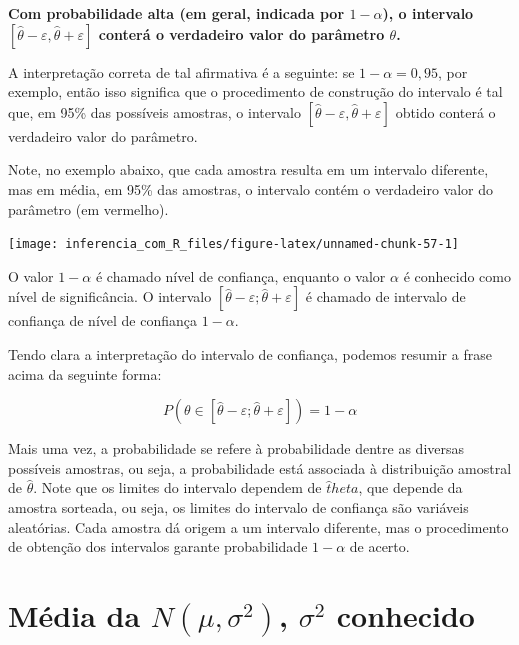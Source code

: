 \documentclass[
]{book}
\begin{document}
\textbf{Com probabilidade alta (em geral, indicada por $1-\alpha$), o intervalo $\left[\hat\theta-\varepsilon,\hat\theta+\varepsilon\right]$ conterá o verdadeiro valor do parâmetro $\theta$.}

A interpretação correta de tal afirmativa é a seguinte: se \(1-\alpha=0,95\), por exemplo, então isso significa que o procedimento de construção do intervalo é tal que, em 95\% das possíveis amostras, o intervalo \(\left[\hat\theta-\varepsilon,\hat\theta+\varepsilon\right]\) obtido conterá o verdadeiro valor do parâmetro.

Note, no exemplo abaixo, que cada amostra resulta em um intervalo diferente, mas em média, em 95\% das amostras, o intervalo contém o verdadeiro valor do parâmetro (em vermelho).

\begin{center}\texttt{[image: inferencia\_com\_R\_files/figure-latex/unnamed-chunk-57-1]} \end{center}

O valor \(1 - \alpha\) é chamado nível de confiança, enquanto o valor \(\alpha\) é conhecido como nível de significância. O intervalo \(\left[\hat\theta-\varepsilon;\hat\theta + \varepsilon\right]\) é chamado de intervalo de confiança de nível de confiança \(1 - \alpha\).

Tendo clara a interpretação do intervalo de confiança, podemos resumir a frase acima da seguinte forma:

\[P\left(\theta\in[\hat\theta-\varepsilon;\hat\theta+\varepsilon]\right)=1-\alpha\]

Mais uma vez, a probabilidade se refere à probabilidade dentre as diversas possíveis amostras, ou seja, a probabilidade está associada à distribuição amostral de \(\hat \theta\). Note que os limites do intervalo dependem de \(\hat theta\), que depende da amostra sorteada, ou seja, os limites do intervalo de confiança são variáveis aleatórias. Cada amostra dá origem a um intervalo diferente, mas o procedimento de obtenção dos intervalos garante probabilidade \(1 - \alpha\) de acerto.

\hypertarget{muxe9dia-da-nmusigma2-sigma2-conhecido}{%
\section{\texorpdfstring{Média da \(N(\mu,\sigma^2)\), \(\sigma^2\) conhecido}{Média da N(\textbackslash mu,\textbackslash sigma\^{}2), \textbackslash sigma\^{}2 conhecido}}\label{muxe9dia-da-nmusigma2-sigma2-conhecido}}
\end{document}
